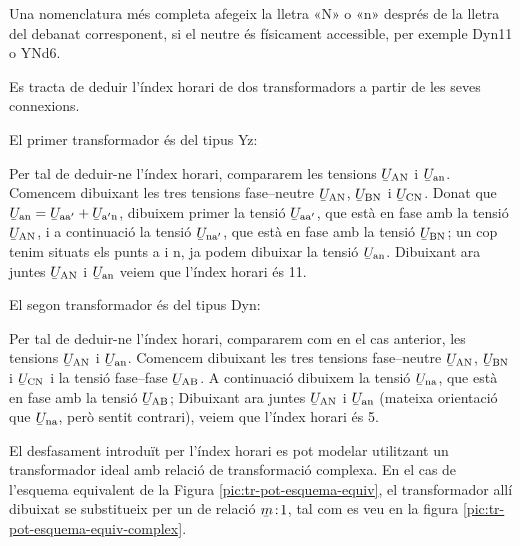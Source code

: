 Una nomenclatura més completa afegeix la lletra «N» o «n» després de la lletra del debanat corresponent, si el neutre és físicament accessible, per exemple Dyn11 o YNd6.


\begin{exemple}
    Es tracta de deduir l'índex horari de dos transformadors a partir de les seves connexions.


    El primer transformador és del tipus Yz:
     \vspace{-2mm}
    \begin{center}
        
    \end{center}
     Per tal de deduir-ne l'índex horari, compararem les tensions
    $\cmplx{U}\ped{AN}$ i $\cmplx{U}\ped{an}$. Comencem dibuixant les tres tensions fase--neutre $\cmplx{U}\ped{AN}$, $\cmplx{U}\ped{BN}$ i $\cmplx{U}\ped{CN}$. Donat que $\cmplx{U}\ped{an} = \cmplx{U}\ped{aa'} + \cmplx{U}\ped{a'n}$, dibuixem primer la tensió $\cmplx{U}\ped{aa'}$, que està en fase amb la tensió $\cmplx{U}\ped{AN}$, i a continuació la tensió $\cmplx{U}\ped{na'}$, que està en fase amb la tensió $\cmplx{U}\ped{BN}$; un cop tenim situats els punts a i n, ja podem dibuixar la tensió $\cmplx{U}\ped{an}$. Dibuixant ara juntes $\cmplx{U}\ped{AN}$ i $\cmplx{U}\ped{an}$  veiem que l'índex horari és 11.


     El segon transformador és del tipus Dyn:
      \vspace{-2mm}
    \begin{center}
       
    \end{center}
      Per tal de deduir-ne l'índex horari, compararem com en el cas anterior, les tensions $\cmplx{U}\ped{AN}$ i $\cmplx{U}\ped{an}$. Comencem dibuixant les tres tensions fase--neutre $\cmplx{U}\ped{AN}$, $\cmplx{U}\ped{BN}$ i $\cmplx{U}\ped{CN}$ i la tensió fase--fase $\cmplx{U}\ped{AB}$.  A continuació dibuixem la tensió $\cmplx{U}\ped{na}$, que està en fase amb la tensió $\cmplx{U}\ped{AB}$; Dibuixant ara juntes $\cmplx{U}\ped{AN}$ i $\cmplx{U}\ped{an}$ (mateixa orientació que $\cmplx{U}\ped{na}$, però sentit contrari),  veiem que l'índex horari és 5.
\end{exemple}

El desfasament introduït per l'índex horari es pot modelar utilitzant  un transformador ideal amb relació de transformació complexa. En el cas de l'esquema equivalent de la Figura  \vref{pic:tr-pot-esquema-equiv}, el transformador allí dibuixat
se substitueix per un de relació $\cmplx{m}\!:\!1$, tal com es veu en la figura \vref{pic:tr-pot-esquema-equiv-complex}.

